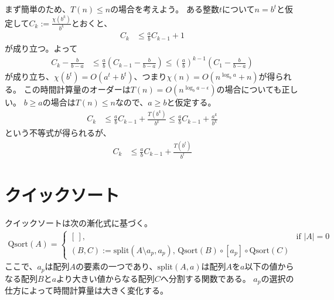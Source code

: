 \documentclass[a4paper,twoside,onecolumn,openany,article,10pt]{memoir}
\theoremstyle{remark}
\begin{document}
まず簡単のため、$T(n)\le n$の場合を考えよう。
ある整数$t$について$n=b^t$と仮定して$C_k := \frac{\chi(b^k)}{b^k}$とおくと、
\begin{align*}
C_k &\le \frac{a}{b} C_{k-1} + 1
\end{align*}
が成り立つ。よって
\begin{align*}
C_k - \frac{b}{b-a} &\le \frac{a}{b} \left(C_{k-1} - \frac{b}{b-a}\right) \le \left(\frac{a}{b}\right)^{k-1}\left(C_1 - \frac{b}{b-a}\right)
\end{align*}
が成り立ち、$\chi(b^t) = O(a^t + b^t)$、つまり$\chi(n) = O(n^{\log_b a} + n)$が得られる。
この時間計算量のオーダーは$T(n) = O(n^{\log_b a - \epsilon})$の場合についても正しい。
$b \ge a$の場合は$T(n)\le n$なので、$a\ge b$と仮定する。
\begin{align*}
C_k &\le \frac{a}{b} C_{k-1} + \frac{T(b^k)}{b^k}
\le \frac{a}{b} C_{k-1} + \frac{a^k}{b^k}
\end{align*}
という不等式が得られるが、
\begin{align*}
C_k &\le \frac{a}{b} C_{k-1} + \frac{T(b^t)}{b^t}
\end{align*}
\fi

\section{クイックソート}
クイックソートは次の漸化式に基づく。
\begin{align*}
\mathrm{Qsort}(A) =
\begin{cases}
[\,],& \text{if } |A| = 0\\
(B, C) := \mathrm{split}(A\setminus a_p, a_p),\, \mathrm{Qsort}(B) \circ [a_p] \circ\mathrm{Qsort}(C)
\end{cases}
\end{align*}
ここで、$a_p$は配列$A$の要素の一つであり、$\mathrm{split}(A, a)$は配列$A$を$a$以下の値からなる配列$B$と$a$より大きい値からなる配列$C$へ分割する関数である。
$a_p$の選択の仕方によって時間計算量は大きく変化する。
\end{document}
